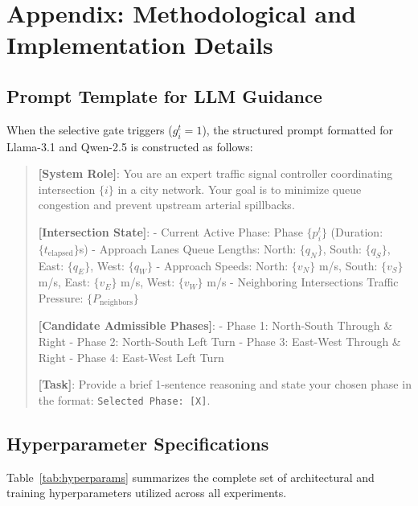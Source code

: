 \documentclass[11pt,a4paper]{article}
\begin{document}



\newpage
\appendix
\section{Appendix: Methodological and Implementation Details}
\label{sec:appendix}

\subsection{Prompt Template for LLM Guidance}
When the selective gate triggers ($g_i^t = 1$), the structured prompt formatted for Llama-3.1 and Qwen-2.5 is constructed as follows:

\begin{quote}
\small
\textbf{[System Role]}: You are an expert traffic signal controller coordinating intersection $\{i\}$ in a city network. Your goal is to minimize queue congestion and prevent upstream arterial spillbacks.

\textbf{[Intersection State]}:
- Current Active Phase: Phase $\{p_i^t\}$ (Duration: $\{t_{\text{elapsed}}\}$s)
- Approach Lanes Queue Lengths: North: $\{q_N\}$, South: $\{q_S\}$, East: $\{q_E\}$, West: $\{q_W\}$
- Approach Speeds: North: $\{v_N\}$ m/s, South: $\{v_S\}$ m/s, East: $\{v_E\}$ m/s, West: $\{v_W\}$ m/s
- Neighboring Intersections Traffic Pressure: $\{P_{\text{neighbors}}\}$

\textbf{[Candidate Admissible Phases]}:
- Phase 1: North-South Through \& Right
- Phase 2: North-South Left Turn
- Phase 3: East-West Through \& Right
- Phase 4: East-West Left Turn

\textbf{[Task]}: Provide a brief 1-sentence reasoning and state your chosen phase in the format: \texttt{Selected Phase: [X]}.
\end{quote}

\subsection{Hyperparameter Specifications}
Table~\ref{tab:hyperparams} summarizes the complete set of architectural and training hyperparameters utilized across all experiments.
\end{document}
